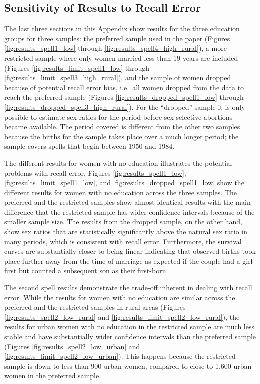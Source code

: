 \documentclass[12pt,letterpaper]{article}
\begin{document}
\subsection{Sensitivity of Results to Recall Error}



The last three sections in this Appendix show results for the three education groups for 
three samples: the preferred sample used in the paper (Figures \ref{fig:results_spell1_low}
through \ref{fig:results_spell4_high_rural}), 
a more restricted sample where only women married less than 19 years are 
included (Figures \ref{fig:results_limit_spell1_low} through \ref{fig:results_limit_spell3_high_rural}),
and the sample of women dropped because of potential recall error bias, i.e.\ all women 
dropped from the data to reach the preferred sample (Figures \ref{fig:results_dropped_spell1_low}
through \ref{fig:results_dropped_spell3_high_rural}).
For the ``dropped'' sample it is only possible to estimate sex ratios for the period
before sex-selective abortions became available.
The period covered is different from the other two samples because the births for 
the sample takes place over a much longer period; the sample covers spells that begin
between 1950 and 1984.

The different results for women with no education illustrates the potential problems 
with recall error.
Figures \ref{fig:results_spell1_low}, \ref{fig:results_limit_spell1_low}, and 
\ref{fig:results_dropped_spell1_low} show the different results for women with no
education across the three samples.
The preferred and the restricted samples show almost identical results with the main
difference that the restricted sample has wider confidence intervals because of the
smaller sample size.
The results from the dropped sample, on the other hand, show sex ratios that are 
statistically significantly above the natural sex ratio in many periods, which is
consistent with recall error.
Furthermore, the survival curves are substantially closer to being linear indicating
that observed births took place further away from the time of marriage as expected if 
the couple had a girl first but counted a subsequent son as their first-born.

The second spell results demonstrate the trade-off inherent in dealing with recall error.
While the results for women with no education are similar across the preferred and the
restricted samples in rural areas (Figures \ref{fig:results_spell2_low_rural} and
\ref{fig:results_limit_spell2_low_rural}), the results for urban women with no 
education in the restricted sample are much less stable and have substantially wider
confidence intervals than the preferred sample (Figures \ref{fig:results_spell2_low_urban}
and \ref{fig:results_limit_spell2_low_urban}).
This happens because the restricted sample is down to less than 900 urban women, compared
to close to 1,600 urban women in the preferred sample.
\end{document}
